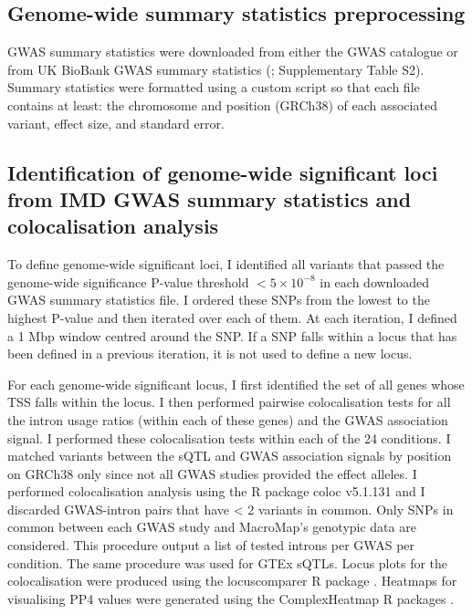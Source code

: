 \subsection{Genome-wide summary statistics preprocessing}
GWAS summary statistics were downloaded from either the GWAS catalogue \cite{Buniello2019-wb} or from UK BioBank GWAS summary statistics (\cite{Zhou2018-jh}; Supplementary Table S2). Summary statistics were formatted using a custom script so that each file contains at least: the chromosome and position (GRCh38) of each associated variant, effect size, and standard error. 

\subsection{Identification of genome-wide significant loci from IMD GWAS summary statistics and colocalisation analysis}
To define genome-wide significant loci, I identified all variants that passed the genome-wide significance P-value threshold $< 5\times10^{-8}$ in each downloaded GWAS summary statistics file. I ordered these SNPs from the lowest to the highest P-value and then iterated over each of them. At each iteration, I defined a 1 Mbp window centred around the SNP. If a SNP falls within a locus that has been defined in a previous iteration, it is not used to define a new locus. 

For each genome-wide significant locus, I first identified the set of all genes whose TSS falls within the locus. I then performed pairwise colocalisation tests for all the intron usage ratios (within each of these genes) and the GWAS association signal. I performed these colocalisation tests within each of the 24 conditions. I matched variants between the sQTL and GWAS association signals by position on GRCh38 only since not all GWAS studies provided the effect alleles. I performed colocalisation analysis using the R package coloc v5.1.131 and I discarded GWAS-intron pairs that have < 2 variants in common. Only SNPs in common between each GWAS study and MacroMap's genotypic data are considered. This procedure output a list of tested introns per GWAS per condition. The same procedure was used for GTEx sQTLs. Locus plots for the colocalisation were produced using the locuscomparer R package \cite{Liu2019-fv}. Heatmaps for visualising PP4 values were generated using the ComplexHeatmap R packages \cite{Gu2016-oc}.

